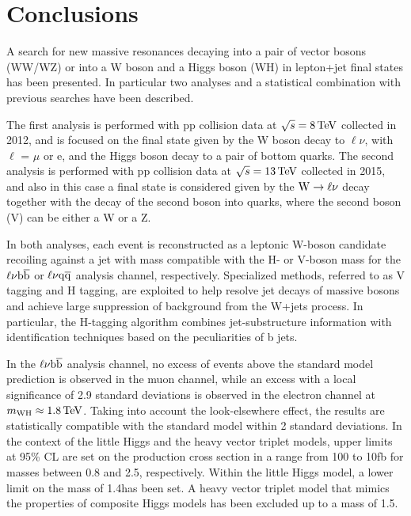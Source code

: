\chapter{Conclusions}
\label{ch:summary1}

A search for new massive resonances decaying into a pair of vector bosons (WW/WZ) or into a W boson and a Higgs boson (WH)
in lepton+jet final states has been presented. In particular two analyses and a statistical combination with previous searches have been described.

The first analysis is performed with pp collision data at $\sqrt{s} = 8\,\text{Te\hspace{-.08em}V}$ collected in 2012, and is focused on the final state given by the W boson decay to $\ell\nu$, with $\ell$ = $\mu$ or e,
and the Higgs boson decay to a pair of bottom quarks.
The second analysis is performed with pp collision data at $\sqrt{s} = 13\,\text{Te\hspace{-.08em}V}$ collected in 2015, and also in this case a final state is considered given by the $\mathrm{W}\to\ell\nu$ decay together with the decay of the second boson into quarks, where the second boson (V) can be either a W or a Z. 

In both analyses, each event is reconstructed as a leptonic W-boson candidate recoiling against a jet with mass compatible with the H- or V-boson mass for the $\ell\nu{\mathrm{b}\overline{\mathrm{b}}}$ or $\ell\nu\mathrm{q}\overline{\mathrm{q}}$ analysis channel, respectively.
Specialized methods, referred to as V tagging and H tagging, are exploited to help resolve jet decays of massive bosons and achieve large suppression of background from the W+jets process.
In particular, the H-tagging algorithm combines jet-substructure information with identification techniques based on the peculiarities of b jets.

In the $\ell\nu{\mathrm{b}\overline{\mathrm{b}}}$ analysis channel, no excess of events above the standard model prediction is observed in the muon channel,
while an excess with a local significance of 2.9 standard deviations is observed in the electron channel at $m_{\rm WH} \approx 1.8\,\text{Te\hspace{-.08em}V}$.
Taking into account the look-elsewhere effect, the results are statistically compatible with the standard model within 2 standard deviations.
In the context of the little Higgs and the heavy vector triplet models, upper limits at 95\% CL are set on the \Wpr production cross section
in a range from 100 to 10\unit{fb} for masses between 0.8 and 2.5\TeV, respectively.
Within the little Higgs model, a lower limit on the \Wpr mass of 1.4\TeV has been set.
A heavy vector triplet model that mimics the properties of composite Higgs models has been excluded up to a \Wpr mass of 1.5\TeV.

